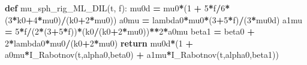 \documentclass[
  a4paper,
  numbers=noendperiod,
  DIV=12]{scrreprt}
\newenvironment{Shaded}{\begin{snugshade}}{\end{snugshade}}
\newcommand{\ControlFlowTok}[1]{\textcolor[rgb]{0.13,0.29,0.53}{\textbf{#1}}}
\newcommand{\DecValTok}[1]{\textcolor[rgb]{0.00,0.00,0.81}{#1}}
\newcommand{\KeywordTok}[1]{\textcolor[rgb]{0.13,0.29,0.53}{\textbf{#1}}}
\newcommand{\NormalTok}[1]{#1}
\newcommand{\OperatorTok}[1]{\textcolor[rgb]{0.81,0.36,0.00}{\textbf{#1}}}
\begin{document}
\begin{Shaded}
\begin{Highlighting}[]
\KeywordTok{def}\NormalTok{ mu\_sph\_rig\_ML\_DIL(t, f):}
\NormalTok{    mu0d  }\OperatorTok{=}\NormalTok{ mu0}\OperatorTok{*}\NormalTok{(}\DecValTok{1} \OperatorTok{+} \DecValTok{5}\OperatorTok{*}\NormalTok{f}\OperatorTok{/}\DecValTok{6}\OperatorTok{*}\NormalTok{(}\DecValTok{3}\OperatorTok{*}\NormalTok{k0}\OperatorTok{+}\DecValTok{4}\OperatorTok{*}\NormalTok{mu0)}\OperatorTok{/}\NormalTok{(k0}\OperatorTok{+}\DecValTok{2}\OperatorTok{*}\NormalTok{mu0))}
\NormalTok{    a0mu  }\OperatorTok{=}\NormalTok{ lambda0}\OperatorTok{*}\NormalTok{mu0}\OperatorTok{*}\NormalTok{(}\DecValTok{3}\OperatorTok{+}\DecValTok{5}\OperatorTok{*}\NormalTok{f)}\OperatorTok{/}\NormalTok{(}\DecValTok{3}\OperatorTok{*}\NormalTok{mu0d)}
\NormalTok{    a1mu  }\OperatorTok{=} \DecValTok{5}\OperatorTok{*}\NormalTok{f}\OperatorTok{/}\NormalTok{(}\DecValTok{2}\OperatorTok{*}\NormalTok{(}\DecValTok{3}\OperatorTok{+}\DecValTok{5}\OperatorTok{*}\NormalTok{f))}\OperatorTok{*}\NormalTok{(k0}\OperatorTok{/}\NormalTok{(k0}\OperatorTok{+}\DecValTok{2}\OperatorTok{*}\NormalTok{mu0))}\OperatorTok{**}\DecValTok{2}\OperatorTok{*}\NormalTok{a0mu}
\NormalTok{    beta1 }\OperatorTok{=}\NormalTok{ beta0 }\OperatorTok{+} \DecValTok{2}\OperatorTok{*}\NormalTok{lambda0}\OperatorTok{*}\NormalTok{mu0}\OperatorTok{/}\NormalTok{(k0}\OperatorTok{+}\DecValTok{2}\OperatorTok{*}\NormalTok{mu0)}
    \ControlFlowTok{return}\NormalTok{ mu0d}\OperatorTok{*}\NormalTok{(}\DecValTok{1} \OperatorTok{+}\NormalTok{ a0mu}\OperatorTok{*}\NormalTok{I\_Rabotnov(t,alpha0,beta0) }\OperatorTok{+}\NormalTok{ a1mu}\OperatorTok{*}\NormalTok{I\_Rabotnov(t,alpha0,beta1))}


\end{Highlighting}
\end{Shaded}
\end{document}
